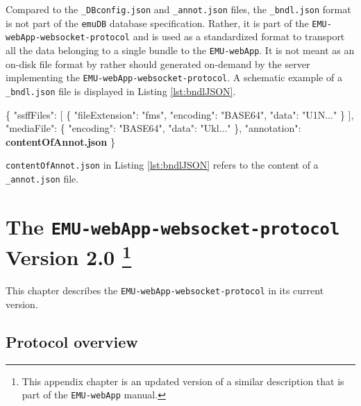 \documentclass[]{book}
\newenvironment{Shaded}{\begin{snugshade}}{\end{snugshade}}
\newcommand{\DataTypeTok}[1]{\textcolor[rgb]{0.13,0.29,0.53}{#1}}
\newcommand{\ErrorTok}[1]{\textcolor[rgb]{0.64,0.00,0.00}{\textbf{#1}}}
\newcommand{\FunctionTok}[1]{\textcolor[rgb]{0.00,0.00,0.00}{#1}}
\newcommand{\OtherTok}[1]{\textcolor[rgb]{0.56,0.35,0.01}{#1}}
\newcommand{\StringTok}[1]{\textcolor[rgb]{0.31,0.60,0.02}{#1}}
\let\rmarkdownfootnote\footnote%
\def\footnote{\protect\rmarkdownfootnote}
\begin{document}
Compared to the \texttt{\_DBconfig.json} and \texttt{\_annot.json} files, the \texttt{\_bndl.json} format is not part of the \texttt{emuDB} database specification. Rather, it is part of the \texttt{EMU-webApp-websocket-protocol} and is used as a standardized format to transport all the data belonging to a single bundle to the \texttt{EMU-webApp}. It is not meant as an on-disk file format by rather should generated on-demand by the server implementing the \texttt{EMU-webApp-websocket-protocol}. A schematic example of a \texttt{\_bndl.json} file is displayed in Listing \ref{lst:bndlJSON}.

\begin{Shaded}
\begin{Highlighting}[]
\FunctionTok{\{}
 \DataTypeTok{"ssffFiles"}\FunctionTok{:} \OtherTok{[}
  \FunctionTok{\{}
   \DataTypeTok{"fileExtension"}\FunctionTok{:} \StringTok{"fms"}\FunctionTok{,}
   \DataTypeTok{"encoding"}\FunctionTok{:} \StringTok{"BASE64"}\FunctionTok{,}
   \DataTypeTok{"data"}\FunctionTok{:} \StringTok{"U1N..."}
  \FunctionTok{\}}
 \OtherTok{]}\FunctionTok{,}
 \DataTypeTok{"mediaFile"}\FunctionTok{:} \FunctionTok{\{}
  \DataTypeTok{"encoding"}\FunctionTok{:} \StringTok{"BASE64"}\FunctionTok{,}
  \DataTypeTok{"data"}\FunctionTok{:} \StringTok{"Ukl..."}
 \FunctionTok{\},}
 \DataTypeTok{"annotation"}\FunctionTok{:} \ErrorTok{contentOfAnnot.json}
\FunctionTok{\}}
\end{Highlighting}
\end{Shaded}

\texttt{contentOfAnnot.json} in Listing \ref{lst:bndlJSON} refers to the content of a \texttt{\_annot.json} file.

\hypertarget{app-chap:wsProtocol}{%
\chapter[The \texttt{EMU-webApp-websocket-protocol} Version 2.0 ]{\texorpdfstring{The \texttt{EMU-webApp-websocket-protocol} Version 2.0 \footnote{This appendix chapter is an updated version of a similar description that is part of the \texttt{EMU-webApp} manual.}}{The EMU-webApp-websocket-protocol Version 2.0 }}\label{app-chap:wsProtocol}}

This chapter describes the \texttt{EMU-webApp-websocket-protocol} in its current version.

\hypertarget{protocol-overview}{%
\section{Protocol overview}\label{protocol-overview}}
\end{document}
